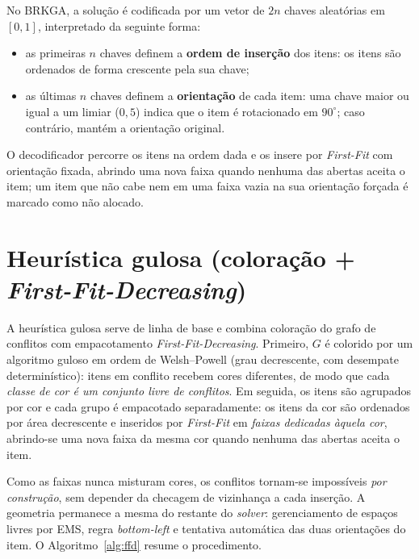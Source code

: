 \documentclass{report}
\begin{document}
No BRKGA, a solução é codificada por um vetor de $2n$ chaves aleatórias em
$[0,1]$, interpretado da seguinte forma:
\begin{itemize}
    \item as primeiras $n$ chaves definem a \textbf{ordem de inserção} dos
          itens: os itens são ordenados de forma crescente pela sua chave;
    \item as últimas $n$ chaves definem a \textbf{orientação} de cada item: uma
          chave maior ou igual a um limiar ($0{,}5$) indica que o item é
          rotacionado em $90^\circ$; caso contrário, mantém a orientação
          original.
\end{itemize}
O decodificador percorre os itens na ordem dada e os insere por
\textit{First-Fit} com orientação fixada, abrindo uma nova faixa quando nenhuma
das abertas aceita o item; um item que não cabe nem em uma faixa vazia na sua
orientação forçada é marcado como não alocado.

\section{Heurística gulosa (coloração + \textit{First-Fit-Decreasing})}

A heurística gulosa serve de linha de base e combina coloração do grafo de
conflitos com empacotamento \textit{First-Fit-Decreasing}. Primeiro, $G$ é
colorido por um algoritmo guloso em ordem de Welsh--Powell (grau decrescente,
com desempate determinístico): itens em conflito recebem cores diferentes, de
modo que cada \emph{classe de cor é um conjunto livre de conflitos}. Em
seguida, os itens são agrupados por cor e cada grupo é empacotado
separadamente: os itens da cor são ordenados por área decrescente e inseridos
por \textit{First-Fit} em \emph{faixas dedicadas àquela cor}, abrindo-se uma
nova faixa da mesma cor quando nenhuma das abertas aceita o item.

Como as faixas nunca misturam cores, os conflitos tornam-se impossíveis
\emph{por construção}, sem depender da checagem de vizinhança a cada inserção.
A geometria permanece a mesma do restante do \textit{solver}: gerenciamento de
espaços livres por EMS, regra \textit{bottom-left} e tentativa automática das
duas orientações do item. O Algoritmo~\ref{alg:ffd} resume o procedimento.
\end{document}
